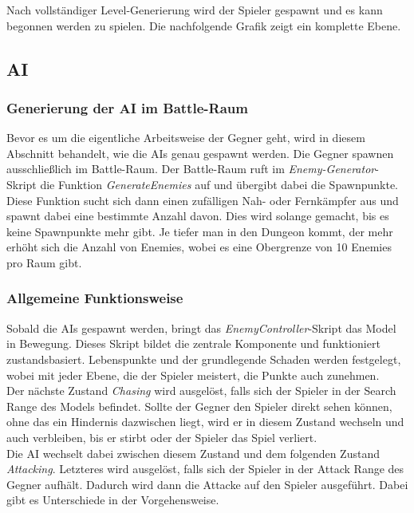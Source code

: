Nach vollständiger Level-Generierung wird der Spieler gespawnt und es kann begonnen werden zu spielen.
Die nachfolgende Grafik zeigt ein komplette Ebene.


\subsection{AI}

\subsubsection{Generierung der AI im Battle-Raum}

Bevor es um die eigentliche Arbeitsweise der Gegner geht, wird in diesem Abschnitt behandelt, wie die AIs genau gespawnt werden. Die Gegner spawnen ausschließlich im Battle-Raum. Der Battle-Raum ruft im \textit{Enemy-Generator}-Skript die Funktion \textit{GenerateEnemies} auf und übergibt dabei die Spawnpunkte. Diese Funktion sucht sich dann einen zufälligen Nah- oder Fernkämpfer aus und spawnt dabei eine bestimmte Anzahl davon. Dies wird solange gemacht, bis es keine Spawnpunkte mehr gibt. Je tiefer man in den Dungeon kommt, der mehr erhöht sich die Anzahl von Enemies, wobei es eine Obergrenze von 10 Enemies pro Raum gibt. \\

\subsubsection{Allgemeine Funktionsweise}

Sobald die AIs gespawnt werden, bringt das \textit{EnemyController}-Skript das Model in Bewegung. Dieses Skript bildet die zentrale Komponente und funktioniert zustandsbasiert. Lebenspunkte und der grundlegende Schaden werden festgelegt, wobei mit jeder Ebene, die der Spieler meistert, die Punkte auch zunehmen. \\

Der nächste Zustand \textit{Chasing} wird ausgelöst, falls sich der Spieler in der Search Range des Models befindet. Sollte der Gegner den Spieler direkt sehen können, ohne das ein Hindernis dazwischen liegt, wird er in diesem Zustand wechseln und auch verbleiben, bis er stirbt oder der Spieler das Spiel verliert. \\

Die AI wechselt dabei zwischen diesem Zustand und dem folgenden Zustand \textit{Attacking}. Letzteres wird ausgelöst, falls sich der Spieler in der Attack Range des Gegner aufhält. Dadurch wird dann die Attacke auf den Spieler ausgeführt. Dabei gibt es Unterschiede in der Vorgehensweise. \\


